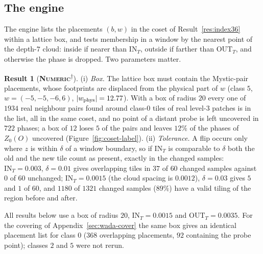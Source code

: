\documentclass[11pt]{article}
\newcommand{\numeric}{\textbf{\textsc{Numeric}}}
\newcommand{\snap}{\textsuperscript{$\dagger$}}      %
\theoremstyle{definition}
\newtheorem{result}{Result}
\begin{document}
\subsection{The engine}\label{sec:flips-engine}
The engine lists the placements $(b,w)$ in the coset of Result~\ref{res:index36} within a lattice box, and tests membership in a window by the nearest point of the depth-$7$ cloud: inside if nearer than $\mathrm{IN}_T$, outside if farther than $\mathrm{OUT}_T$, and otherwise the phase is dropped. Two parameters matter.
\begin{result}[\numeric\snap]\label{res:flip-engine}
(i) \emph{Box.} The lattice box must contain the Mystic-pair placements, whose footprints are displaced from the physical part of $w$ (class $5$, $w=(-5,-5,-6,6)$, $|w_{\rm phys}|=12.77$). With a box of radius $20$ every one of $1934$ real neighbour pairs found around class-$0$ tiles of real level-$3$ patches is in the list, all in the same coset, and no point of a distant probe is left uncovered in $722$ phases; a box of $12$ loses $5$ of the pairs and leaves $12\%$ of the phases of $Z_0(O)$ uncovered (Figure~\ref{fig:coset-label}). (ii) \emph{Tolerance.} A flip occurs only where $z$ is within $\delta$ of a window boundary, so if $\mathrm{IN}_T$ is comparable to $\delta$ both the old and the new tile count as present, exactly in the changed samples: $\mathrm{IN}_T=0.003$, $\delta=0.01$ gives overlapping tiles in $37$ of $60$ changed samples against $0$ of $60$ unchanged; $\mathrm{IN}_T=0.0015$ (the cloud spacing is $0.0012$), $\delta=0.03$ gives $5$ and $1$ of $60$, and $1180$ of $1321$ changed samples ($89\%$) have a valid tiling of the region before and after.
\end{result}
All results below use a box of radius $20$, $\mathrm{IN}_T=0.0015$ and $\mathrm{OUT}_T=0.0035$. For the covering of Appendix~\ref{sec:wada-cover} the same box gives an identical placement list for class $0$ ($368$ overlapping placements, $92$ containing the probe point); classes $2$ and $5$ were not rerun.
\end{document}
